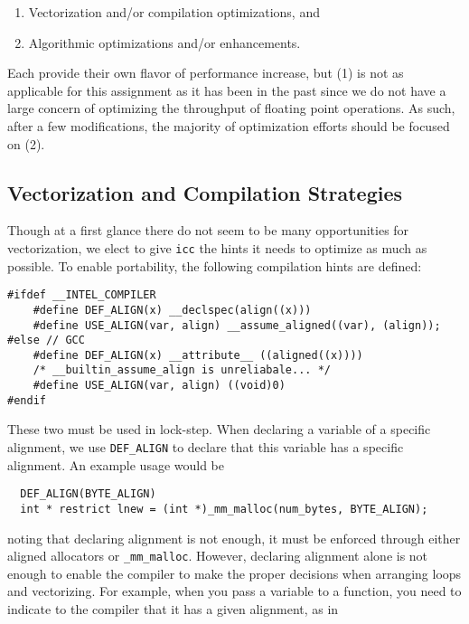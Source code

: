 \documentclass[11pt]{article}
\begin{document}
\begin{enumerate}[1.]
  \item Vectorization and/or compilation optimizations, and
  \item Algorithmic optimizations and/or enhancements.
\end{enumerate}

\noindent Each provide their own flavor of performance increase, but (1) is not as applicable for this assignment as it has been in the past since we do not have a large concern of optimizing the throughput of floating point operations.  As such, after a few modifications, the majority of optimization efforts should be focused on (2).

\subsection{Vectorization and Compilation Strategies}

Though at a first glance there do not seem to be many opportunities for vectorization, we elect to give \texttt{icc} the hints it needs to optimize as much as possible.  To enable portability, the following compilation hints are defined:

\begin{lstlisting}
#ifdef __INTEL_COMPILER
    #define DEF_ALIGN(x) __declspec(align((x)))
    #define USE_ALIGN(var, align) __assume_aligned((var), (align));
#else // GCC
    #define DEF_ALIGN(x) __attribute__ ((aligned((x))))
    /* __builtin_assume_align is unreliabale... */
    #define USE_ALIGN(var, align) ((void)0)
#endif
\end{lstlisting}

\noindent These two must be used in lock-step.  When declaring a variable of a specific alignment, we use \texttt{DEF\_ALIGN} to declare that this variable has a specific alignment.  An example usage would be 
\begin{lstlisting}
  DEF_ALIGN(BYTE_ALIGN)
  int * restrict lnew = (int *)_mm_malloc(num_bytes, BYTE_ALIGN);
\end{lstlisting}

\noindent noting that declaring alignment is not enough, it must be enforced through either aligned allocators or \texttt{\_mm\_malloc}.  However, declaring alignment alone is not enough to enable the compiler to make the proper decisions when arranging loops and vectorizing. For example, when you pass a variable to a function, you need to indicate to the compiler that it has a given alignment, as in
\end{document}
